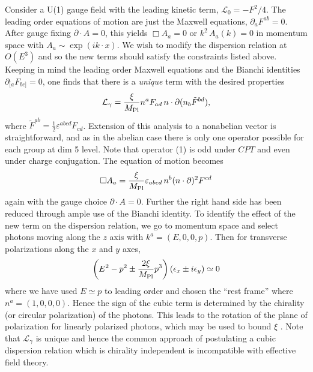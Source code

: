 \documentclass[12pt]{article}
\newcommand{\fr}[2]{\frac{#1}{#2}}
\newcommand{\be}{\begin{equation}}
\newcommand{\ee}{\end{equation}}
\newcommand{\cL}{{\mathcal L}}
\newcommand{\ssc}{\scriptscriptstyle}
\newcommand{\LL}[1]{\cL_{\ssc #1}}
\newcommand{\prt}{\partial}
\newcommand{\veps}{\varepsilon}
\newcommand{\eps}{\epsilon}
\newcommand{\mpl}{M_{\rm {\small Pl}}}
\begin{document}
 Consider a U(1) gauge field with
the leading kinetic term, $\LL0 = - %
F^2/4$. The leading order equations of motion are just the
Maxwell equations, $\prt_a F^{ab}=0$. After gauge fixing
$\prt\cdot A=0$, this yields $\Box A_a=0$ or $k^2\,A_a(k)=0$ in
momentum space with $A_a\sim\exp(ik\cdot x)$. We wish to modify
the dispersion relation at $O(E^3)$ and so the new terms should
satisfy the constraints listed above. Keeping in mind the leading
order Maxwell equations and the Bianchi identities
$\prt_{[a}F_{bc]}=0$, one finds that there is a {\it unique} term
with the desired properties
%
\be \label{nextv} {\mathcal L}_\gamma= {\xi\over\mpl} n^a F_{ad}\,
n\cdot\prt(n_b\tilde F^{bd}), \ee
%
where $\tilde F^{ab}= \fr{1}{2} \veps^{abcd}F_{cd}$. Extension of this analysis to a
nonabelian vector is straightforward, and as in the abelian case
there is only one operator possible for each group at dim 5 level. Note that
operator (1) is odd under $CPT$ and even under charge
conjugation. The equation of motion becomes
%
\be\label{neweomv} \Box A_a={\xi\over\mpl}\veps_{abcd}\,n^b
(n\cdot\prt)^2F^{cd} \ee
%
again with the gauge choice $\prt\cdot A=0$. Further the right
hand side has been reduced through ample use of the Bianchi
identity. To identify the effect of the new term on the dispersion
relation, we go to momentum space and select photons moving along
the $z$ axis with $k^a=(E,0,0,p)$. Then for transverse
polarizations along the $x$ and $y$ axes,
%
\be \label{newdispv}
\left(E^2-p^2\pm{2\xi\over\mpl}p^3\right)(\eps_x\pm i\eps_y)
\simeq0 \ee
%
where we have used $E\simeq p$ to leading order and chosen the
``rest frame'' where $n^a=(1,0,0,0)$. Hence the sign of the cubic
term is determined by the chirality (or circular polarization) of
the photons. This leads to the rotation of the plane of
polarization for linearly polarized photons, which may be used to
bound $\xi$ \cite{rot,wow2}. Note that $\LL\gamma$ is unique and
hence the common approach\cite{mass,Jacob} of postulating a cubic
dispersion relation which is chirality independent is incompatible
with effective field theory.
\end{document}
